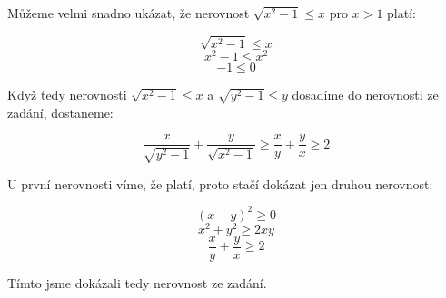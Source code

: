 \documentclass{fkssolpub}
\author{Ondřej Sedláček}
\begin{document}
Můžeme velmi snadno ukázat, že nerovnost $\sqrt{x^2 - 1} \leq x$ pro $x > 1$ platí:

\[
	\sqrt{x^2 - 1} \leq x
\]
\[
	x^2 - 1 \leq x^2
\]
\[
	-1 \leq 0
\]

Když tedy nerovnosti $\sqrt{x^2 - 1} \leq x$ a $\sqrt{y^2 - 1} \leq y$ dosadíme do nerovnosti ze zadání, dostaneme:

\[
	\frac{x}{\sqrt{y^2 - 1}} + \frac{y}{\sqrt{x^2 - 1}} \geq \frac{x}{y} + \frac{y}{x} \geq 2
\]

U první nerovnosti víme, že platí, proto stačí dokázat jen druhou nerovnost:

\[
	(x - y)^2 \geq 0
\]
\[
	x^2 + y^2 \geq 2xy
\]
\[
	\frac{x}{y} + \frac{y}{x} \geq 2
\]

Tímto jsme dokázali tedy nerovnost ze zadání.
\end{document}
